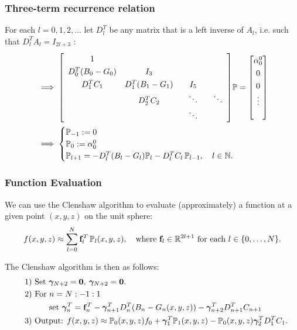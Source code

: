 \documentclass[10pt]{beamer}
\newcommand{\R}{\mathbb{R}}
\newcommand{\N}{\mathbb{N}}
\newcommand{\bigP}{\mathbb{P}}
\newcommand{\Pl}{\mathbb{P}_l}
\newcommand{\Dlt}{D^T_l}
\begin{document}
\frame
{
    \frametitle{Three-term recurrence relation}

For each \(l = 0, 1, 2, \dots\) let \(\Dlt\) be any matrix that is a left inverse of \(A_l\), i.e. such that $\Dlt A_l = I_{2l+3}$ \cite{dunkl2014orthogonal}:
\begin{align}
&\implies 
\renewcommand\arraystretch{1.3}
\mleft[
\begin{array}{cccc}
		1  & & & \\
		D^T_0(B_0-G_0) & I_3 & & \\
		D^T_1 C_1 & D^T_1(B_1-G_1) & \quad I_5 \quad & \\
		& D^T_2 C_2 & \ddots & \ddots \\
		& & \ddots &
\end{array}
\mright]
\bigP
=
\begin{bmatrix}
	\alpha^0_0 \\ 0 \\ 0 \\ \vdots \\ \\
\end{bmatrix} \\
&\implies 
\begin{cases}
\bigP_{-1} := 0 \\
\bigP_{0} := \alpha^0_0 \\
\bigP_{l+1} = -\Dlt (B_l-G_l) \Pl - \Dlt C_l  \,\bigP_{l-1}, \quad l \in \N.
\end{cases}
\end{align}

}

\frame
{
    \frametitle{Function Evaluation}
    
We can use the Clenshaw algorithm to evaluate (approximately) a function at a given point \((x,y,z)\) on the unit sphere:
\begin{align}
f(x,y,z) \approx \sum^N_{l=0} \bold{f}_l^T \, \Pl (x,y,z), \quad \text{where } \mathbf{f}_l \in \R^{2l+1} \text{ for each } l \in \{0,\dots,N\}.
\end{align}

The Clenshaw algorithm is then as follows:
\begin{align*}
\quad &\text{1) } \text{Set } \bm{\gamma}_{N+2} = \bold{0}, \: \bm{\gamma}_{N+2} = \bold{0}. \\
\quad &\text{2) } \text{For } n = N:-1:1 \\
\quad & \quad \quad \quad \text{set } \bm{\gamma}_{n}^T = \bold{f}_n^T - \bm{\gamma}_{n+1}^T D^T_n (B_n - G_n(x,y,z)) -  \bm{\gamma}_{n+2}^T D^T_{n+1}C_{n+1} \\
\quad &\text{3) } \text{Output: } f(x,y,z) \approx \bigP_0(x,y,z) f_0 + \bm{\gamma}_{1}^T \bigP_1(x,y,z) - \bigP_0(x,y,z) \bm{\gamma}_{2}^T D^T_1 C_1.
\end{align*}

}
\end{document}
